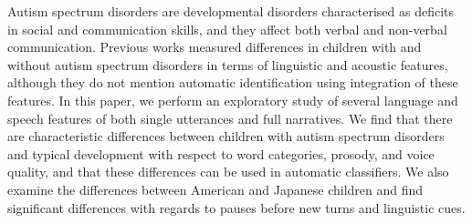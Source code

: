 Autism spectrum disorders are developmental disorders characterised as deficits in social and communication skills, and they affect both verbal and non-verbal communication. Previous works measured differences in children with and without autism spectrum disorders in terms of linguistic and acoustic features, although they do not mention automatic identification using integration of these features. In this paper, we perform an exploratory study of several language and speech features of both single utterances and full narratives. We find that there are characteristic differences between children with autism spectrum disorders and typical development with respect to word categories, prosody, and voice quality, and that these differences can be used in automatic classifiers. We also examine the differences between American and Japanese children and find significant differences with regards to pauses before new turns and linguistic cues.
